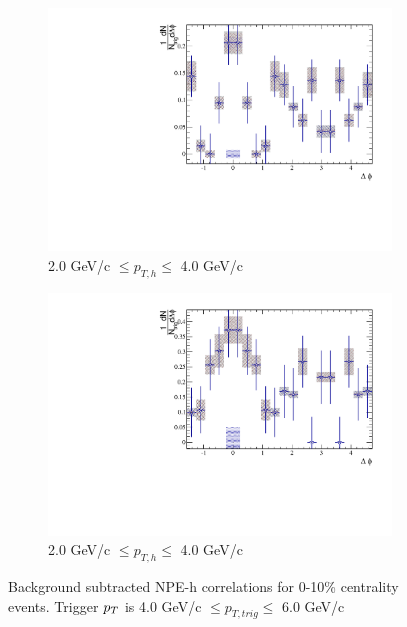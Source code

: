 \begin{figure}[htbp]
\begin{subfigure}{0.5\textwidth}
		\includegraphics[width=\textwidth]{Plots/Correlations/subtracted/NPE_eh_corr_subtracted_primpt_4_5_cent_7_8_assopt_3_4.pdf}
		\caption{2.0 GeV/c $\leq p_{T,h} \leq$ 4.0 GeV/c}
		\label{fig:Sub010e}
	\end{subfigure}	
	\begin{subfigure}{0.5\textwidth}
		\includegraphics[width=\textwidth]{Plots/Correlations/subtracted/NPE_eh_corr_subtracted_primpt_6_8_cent_7_8_assopt_3_4.pdf}
		\caption{2.0 GeV/c $\leq p_{T,h} \leq$ 4.0 GeV/c}
		\label{fig:Sub010f}
	\end{subfigure}	
\caption[Subtracted Correlations 0-10\% Centrality]{Background subtracted NPE-h correlations for 0-10\% centrality events. Trigger $p_{T}$ is 4.0 GeV/c $\leq p_{T,trig} \leq$ 6.0 GeV/c}
\label{fig:Sub010}
\end{figure}

